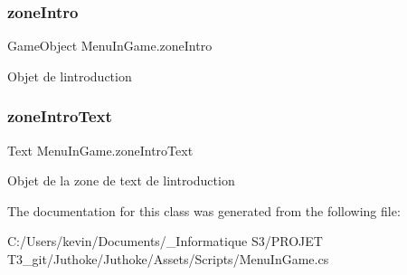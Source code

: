 \subsubsection{\texorpdfstring{zone\+Intro}{zoneIntro}}
{\footnotesize\ttfamily Game\+Object Menu\+In\+Game.\+zone\+Intro\hspace{0.3cm}{\ttfamily [private]}}

Objet de l\textquotesingle{}introduction \mbox{\label{class_menu_in_game_add5f0054bf20eb4dccb2e3e1e6000d5b}} 
\subsubsection{\texorpdfstring{zone\+Intro\+Text}{zoneIntroText}}
{\footnotesize\ttfamily Text Menu\+In\+Game.\+zone\+Intro\+Text\hspace{0.3cm}{\ttfamily [private]}}

Objet de la zone de text de l\textquotesingle{}introduction 

The documentation for this class was generated from the following file\+:\begin{DoxyCompactItemize}
\item 
C\+:/\+Users/kevin/\+Documents/\+\_\+\+Informatique S3/\+P\+R\+O\+J\+E\+T T3\+\_\+git/\+Juthoke/\+Juthoke/\+Assets/\+Scripts/Menu\+In\+Game.\+cs\end{DoxyCompactItemize}

